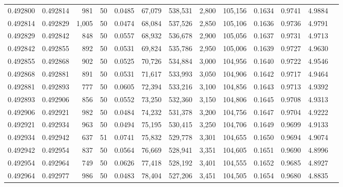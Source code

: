 \begin{tabular}{rrrrrrrrrrrrr}
0.492800 & 0.492814 &   981 &  50 &                                     0.0485 &  67,079 & 538,531 &   2,800 & 105,156 & 0.1634 & 0.9741 & 4.9884 \\
0.492814 & 0.492829 & 1,005 &  50 &                                     0.0474 &  68,084 & 537,526 &   2,850 & 105,106 & 0.1636 & 0.9736 & 4.9791 \\
0.492829 & 0.492842 &   848 &  50 &                                     0.0557 &  68,932 & 536,678 &   2,900 & 105,056 & 0.1637 & 0.9731 & 4.9713 \\
0.492842 & 0.492855 &   892 &  50 &                                     0.0531 &  69,824 & 535,786 &   2,950 & 105,006 & 0.1639 & 0.9727 & 4.9630 \\
0.492855 & 0.492868 &   902 &  50 &                                     0.0525 &  70,726 & 534,884 &   3,000 & 104,956 & 0.1640 & 0.9722 & 4.9546 \\
0.492868 & 0.492881 &   891 &  50 &                                     0.0531 &  71,617 & 533,993 &   3,050 & 104,906 & 0.1642 & 0.9717 & 4.9464 \\
0.492881 & 0.492893 &   777 &  50 &                                     0.0605 &  72,394 & 533,216 &   3,100 & 104,856 & 0.1643 & 0.9713 & 4.9392 \\
0.492893 & 0.492906 &   856 &  50 &                                     0.0552 &  73,250 & 532,360 &   3,150 & 104,806 & 0.1645 & 0.9708 & 4.9313 \\
0.492906 & 0.492921 &   982 &  50 &                                     0.0484 &  74,232 & 531,378 &   3,200 & 104,756 & 0.1647 & 0.9704 & 4.9222 \\
0.492921 & 0.492934 &   963 &  50 &                                     0.0494 &  75,195 & 530,415 &   3,250 & 104,706 & 0.1649 & 0.9699 & 4.9133 \\
0.492934 & 0.492942 &   637 &  51 &                                     0.0741 &  75,832 & 529,778 &   3,301 & 104,655 & 0.1650 & 0.9694 & 4.9074 \\
0.492942 & 0.492954 &   837 &  50 &                                     0.0564 &  76,669 & 528,941 &   3,351 & 104,605 & 0.1651 & 0.9690 & 4.8996 \\
0.492954 & 0.492964 &   749 &  50 &                                     0.0626 &  77,418 & 528,192 &   3,401 & 104,555 & 0.1652 & 0.9685 & 4.8927 \\
0.492964 & 0.492977 &   986 &  50 &                                     0.0483 &  78,404 & 527,206 &   3,451 & 104,505 & 0.1654 & 0.9680 & 4.8835 \\

\end{tabular}
